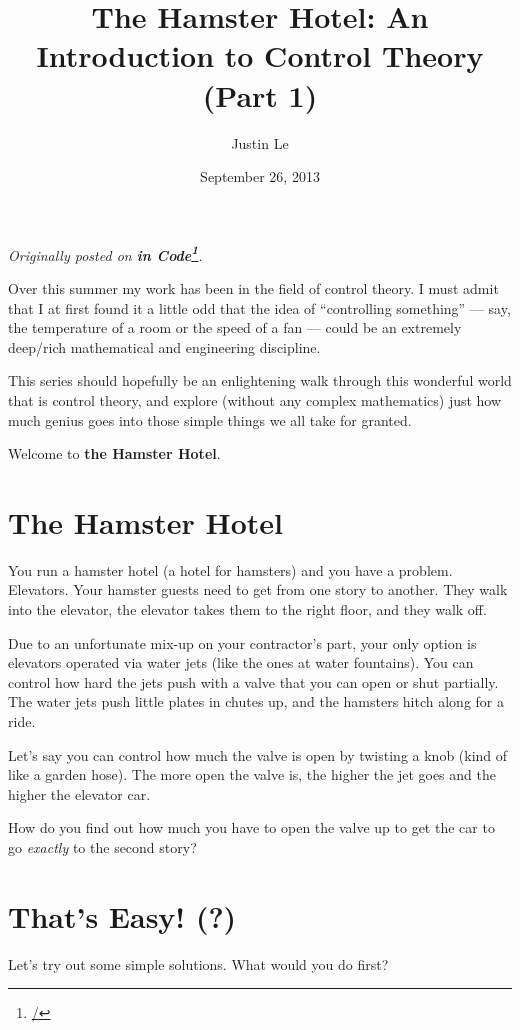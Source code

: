 \documentclass[]{article}
\title{The Hamster Hotel: An Introduction to Control Theory (Part 1)}
\author{Justin Le}
\date{September 26, 2013}
\renewcommand{\href}[2]{#2\footnote{\url{#1}}}
\begin{document}
\maketitle

\emph{Originally posted on \textbf{\href{/}{in Code}}.}

Over this summer my work has been in the field of control theory. I must
admit that I at first found it a little odd that the idea of
``controlling something'' --- say, the temperature of a room or the
speed of a fan --- could be an extremely deep/rich mathematical and
engineering discipline.

This series should hopefully be an enlightening walk through this
wonderful world that is control theory, and explore (without any complex
mathematics) just how much genius goes into those simple things we all
take for granted.

Welcome to \textbf{the Hamster Hotel}.

\section{The Hamster Hotel}\label{the-hamster-hotel}

You run a hamster hotel (a hotel for hamsters) and you have a problem.
Elevators. Your hamster guests need to get from one story to another.
They walk into the elevator, the elevator takes them to the right floor,
and they walk off.

Due to an unfortunate mix-up on your contractor's part, your only option
is elevators operated via water jets (like the ones at water fountains).
You can control how hard the jets push with a valve that you can open or
shut partially. The water jets push little plates in chutes up, and the
hamsters hitch along for a ride.

Let's say you can control how much the valve is open by twisting a knob
(kind of like a garden hose). The more open the valve is, the higher the
jet goes and the higher the elevator car.

How do you find out how much you have to open the valve up to get the
car to go \emph{exactly} to the second story?

\section{That's Easy! (?)}\label{thats-easy}

Let's try out some simple solutions. What would you do first?
\end{document}
